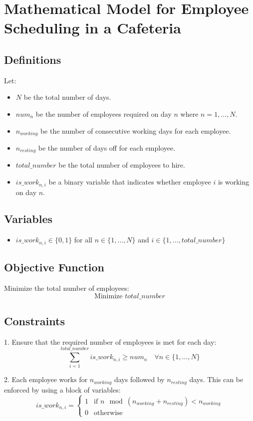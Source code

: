 \documentclass{article}
\begin{document}
\section*{Mathematical Model for Employee Scheduling in a Cafeteria}

\subsection*{Definitions}
Let:
\begin{itemize}
    \item $N$ be the total number of days.
    \item $num_n$ be the number of employees required on day $n$ where $n = 1, \ldots, N$.
    \item $n_{working}$ be the number of consecutive working days for each employee.
    \item $n_{resting}$ be the number of days off for each employee.
    \item $total\_number$ be the total number of employees to hire.
    \item $is\_work_{n, i}$ be a binary variable that indicates whether employee $i$ is working on day $n$.
\end{itemize}

\subsection*{Variables}
\begin{itemize}
    \item $is\_work_{n, i} \in \{0, 1\}$ for all $n \in \{1, \ldots, N\}$ and $i \in \{1, \ldots, total\_number\}$
\end{itemize}

\subsection*{Objective Function}
Minimize the total number of employees:
\[
\text{Minimize } total\_number
\]

\subsection*{Constraints}
1. Ensure that the required number of employees is met for each day:
\[
\sum_{i=1}^{total\_number} is\_work_{n, i} \geq num_n \quad \forall n \in \{1, \ldots, N\}
\]

2. Each employee works for $n_{working}$ days followed by $n_{resting}$ days. This can be enforced by using a block of variables:
\[
is\_work_{n, i} = 
\begin{cases} 
1 & \text{if } n \mod (n_{working} + n_{resting}) < n_{working} \\
0 & \text{otherwise}
\end{cases}
\]
\end{document}
